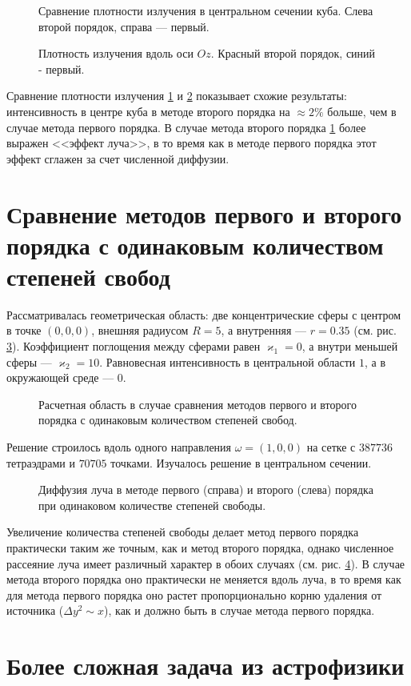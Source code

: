 \begin{figure}[ht!]
\caption{Сравнение плотности излучения в центральном сечении куба. Слева второй порядок, справа --- первый.}
\label{fig:9}
\end{figure}

\begin{figure}[ht!]
\caption{Плотность излучения вдоль оси $Oz$. Красный второй порядок, синий - первый.}
\label{fig:10}
\end{figure}
Сравнение плотности излучения \ref{fig:9} и \ref{fig:10} показывает схожие результаты: интенсивность в центре куба в методе второго порядка на $\approx 2 \%$ больше, чем в случае метода первого порядка. В случае метода второго порядка \ref{fig:9} более выражен <<эффект луча>>, в то время как в методе первого порядка этот эффект сглажен за счет численной диффузии. 

\section{Сравнение методов первого и второго порядка с одинаковым количеством степеней свобод}
Рассматривалась геометрическая область: две концентрические сферы  с центром в точке $(0,0,0)$, внешняя радиусом $R = 5$, а внутренняя --- $r = 0.35$ (см. рис. \ref{fig:11}). Коэффициент поглощения между  сферами равен $\varkappa_1 = 0$, а внутри меньшей сферы --- $\varkappa_2 = 10$. Равновесная интенсивность в центральной области $1$, а в окружающей среде --- $0$. 
\begin{figure}[ht!]
\caption{Расчетная область в случае сравнения методов первого и второго порядка с одинаковым количеством степеней свобод.}
\label{fig:11}
\end{figure}
Решение строилось вдоль одного направления $\omega = (1, 0, 0)$ на сетке с $387736$ тетраэдрами и $70705$ точками. Изучалось решение в центральном сечении. 
\begin{figure}[ht!]
\caption{Диффузия луча в методе первого (справа) и второго (слева) порядка при одинаковом количестве степеней свободы.}
\label{fig:12}
\end{figure}

Увеличение количества степеней свободы делает метод первого порядка практически таким же точным, как и метод второго порядка, однако численное рассеяние луча имеет различный характер в обоих случаях (см. рис. \ref{fig:12}). В случае метода второго порядка оно практически не меняется вдоль луча, в то время как для метода первого порядка оно растет пропорционально корню удаления от источника ($\Delta y^2 \sim x$), как и должно быть в случае метода первого порядка. 
\section{Более сложная задача из астрофизики}
